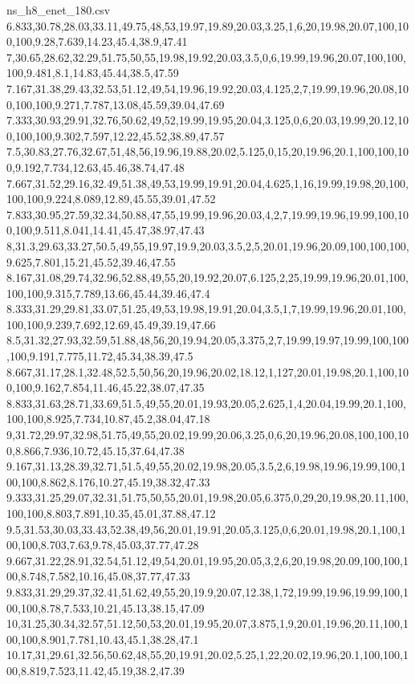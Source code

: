 \begin{filecontents*}[overwrite]{ns_h8_enet_180.csv}
6.833,30.78,28.03,33.11,49.75,48,53,19.97,19.89,20.03,3.25,1,6,20,19.98,20.07,100,100,100,9.28,7.639,14.23,45.4,38.9,47.41
7,30.65,28.62,32.29,51.75,50,55,19.98,19.92,20.03,3.5,0,6,19.99,19.96,20.07,100,100,100,9.481,8.1,14.83,45.44,38.5,47.59
7.167,31.38,29.43,32.53,51.12,49,54,19.96,19.92,20.03,4.125,2,7,19.99,19.96,20.08,100,100,100,9.271,7.787,13.08,45.59,39.04,47.69
7.333,30.93,29.91,32.76,50.62,49,52,19.99,19.95,20.04,3.125,0,6,20.03,19.99,20.12,100,100,100,9.302,7.597,12.22,45.52,38.89,47.57
7.5,30.83,27.76,32.67,51,48,56,19.96,19.88,20.02,5.125,0,15,20,19.96,20.1,100,100,100,9.192,7.734,12.63,45.46,38.74,47.48
7.667,31.52,29.16,32.49,51.38,49,53,19.99,19.91,20.04,4.625,1,16,19.99,19.98,20,100,100,100,9.224,8.089,12.89,45.55,39.01,47.52
7.833,30.95,27.59,32.34,50.88,47,55,19.99,19.96,20.03,4,2,7,19.99,19.96,19.99,100,100,100,9.511,8.041,14.41,45.47,38.97,47.43
8,31.3,29.63,33.27,50.5,49,55,19.97,19.9,20.03,3.5,2,5,20.01,19.96,20.09,100,100,100,9.625,7.801,15.21,45.52,39.46,47.55
8.167,31.08,29.74,32.96,52.88,49,55,20,19.92,20.07,6.125,2,25,19.99,19.96,20.01,100,100,100,9.315,7.789,13.66,45.44,39.46,47.4
8.333,31.29,29.81,33.07,51.25,49,53,19.98,19.91,20.04,3.5,1,7,19.99,19.96,20.01,100,100,100,9.239,7.692,12.69,45.49,39.19,47.66
8.5,31.32,27.93,32.59,51.88,48,56,20,19.94,20.05,3.375,2,7,19.99,19.97,19.99,100,100,100,9.191,7.775,11.72,45.34,38.39,47.5
8.667,31.17,28.1,32.48,52.5,50,56,20,19.96,20.02,18.12,1,127,20.01,19.98,20.1,100,100,100,9.162,7.854,11.46,45.22,38.07,47.35
8.833,31.63,28.71,33.69,51.5,49,55,20.01,19.93,20.05,2.625,1,4,20.04,19.99,20.1,100,100,100,8.925,7.734,10.87,45.2,38.04,47.18
9,31.72,29.97,32.98,51.75,49,55,20.02,19.99,20.06,3.25,0,6,20,19.96,20.08,100,100,100,8.866,7.936,10.72,45.15,37.64,47.38
9.167,31.13,28.39,32.71,51.5,49,55,20.02,19.98,20.05,3.5,2,6,19.98,19.96,19.99,100,100,100,8.862,8.176,10.27,45.19,38.32,47.33
9.333,31.25,29.07,32.31,51.75,50,55,20.01,19.98,20.05,6.375,0,29,20,19.98,20.11,100,100,100,8.803,7.891,10.35,45.01,37.88,47.12
9.5,31.53,30.03,33.43,52.38,49,56,20.01,19.91,20.05,3.125,0,6,20.01,19.98,20.1,100,100,100,8.703,7.63,9.78,45.03,37.77,47.28
9.667,31.22,28.91,32.54,51.12,49,54,20.01,19.95,20.05,3,2,6,20,19.98,20.09,100,100,100,8.748,7.582,10.16,45.08,37.77,47.33
9.833,31.29,29.37,32.41,51.62,49,55,20,19.9,20.07,12.38,1,72,19.99,19.96,19.99,100,100,100,8.78,7.533,10.21,45.13,38.15,47.09
10,31.25,30.34,32.57,51.12,50,53,20.01,19.95,20.07,3.875,1,9,20.01,19.96,20.11,100,100,100,8.901,7.781,10.43,45.1,38.28,47.1
10.17,31,29.61,32.56,50.62,48,55,20,19.91,20.02,5.25,1,22,20.02,19.96,20.1,100,100,100,8.819,7.523,11.42,45.19,38.2,47.39

\end{filecontents*}
